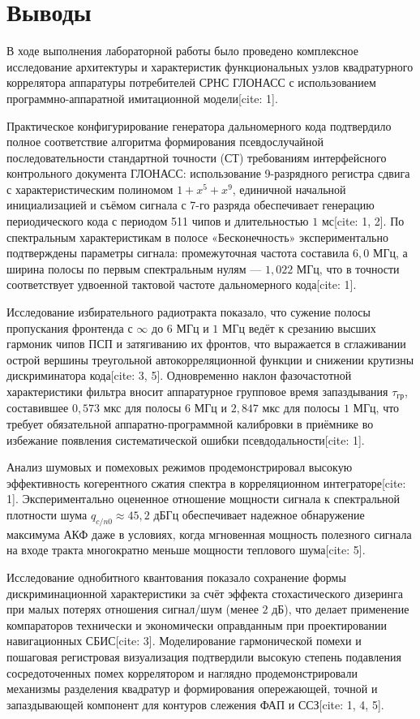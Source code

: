 
\section{Выводы}

В ходе выполнения лабораторной работы было проведено комплексное исследование архитектуры и характеристик функциональных узлов квадратурного коррелятора аппаратуры потребителей СРНС ГЛОНАСС с использованием программно-аппаратной имитационной модели[cite: 1].

Практическое конфигурирование генератора дальномерного кода подтвердило полное соответствие алгоритма формирования псевдослучайной последовательности стандартной точности (СТ) требованиям интерфейсного контрольного документа ГЛОНАСС: использование 9-разрядного регистра сдвига с характеристическим полиномом $1 + x^5 + x^9$, единичной начальной инициализацией и съёмом сигнала с 7-го разряда обеспечивает генерацию периодического кода с периодом 511 чипов и длительностью $1\text{ мс}$[cite: 1, 2]. По спектральным характеристикам в полосе «Бесконечность» экспериментально подтверждены параметры сигнала: промежуточная частота составила $6{,}0\text{ МГц}$, а ширина полосы по первым спектральным нулям — $1{,}022\text{ МГц}$, что в точности соответствует удвоенной тактовой частоте дальномерного кода[cite: 1].

Исследование избирательного радиотракта показало, что сужение полосы пропускания фронтенда с $\infty$ до $6\text{ МГц}$ и $1\text{ МГц}$ ведёт к срезанию высших гармоник чипов ПСП и затягиванию их фронтов, что выражается в сглаживании острой вершины треугольной автокорреляционной функции и снижении крутизны дискриминатора кода[cite: 3, 5]. Одновременно наклон фазочастотной характеристики фильтра вносит аппаратурное групповое время запаздывания $\tau_{\text{гр}}$, составившее $0{,}573\text{ мкс}$ для полосы $6\text{ МГц}$ и $2{,}847\text{ мкс}$ для полосы $1\text{ МГц}$, что требует обязательной аппаратно-программной калибровки в приёмнике во избежание появления систематической ошибки псевдодальности[cite: 1].

Анализ шумовых и помеховых режимов продемонстрировал высокую эффективность когерентного сжатия спектра в корреляционном интеграторе[cite: 1]. Экспериментально оцененное отношение мощности сигнала к спектральной плотности шума $q_{c/n0} \approx 45{,}2\text{ дБГц}$ обеспечивает надежное обнаружение максимума АКФ даже в условиях, когда мгновенная мощность полезного сигнала на входе тракта многократно меньше мощности теплового шума[cite: 5].

Исследование однобитного квантования показало сохранение формы дискриминационной характеристики за счёт эффекта стохастического дизеринга при малых потерях отношения сигнал/шум (менее $2\text{ дБ}$), что делает применение компараторов технически и экономически оправданным при проектировании навигационных СБИС[cite: 3]. Моделирование гармонической помехи и пошаговая регистровая визуализация подтвердили высокую степень подавления сосредоточенных помех коррелятором и наглядно продемонстрировали механизмы разделения квадратур и формирования опережающей, точной и запаздывающей компонент для контуров слежения ФАП и ССЗ[cite: 1, 4, 5].
